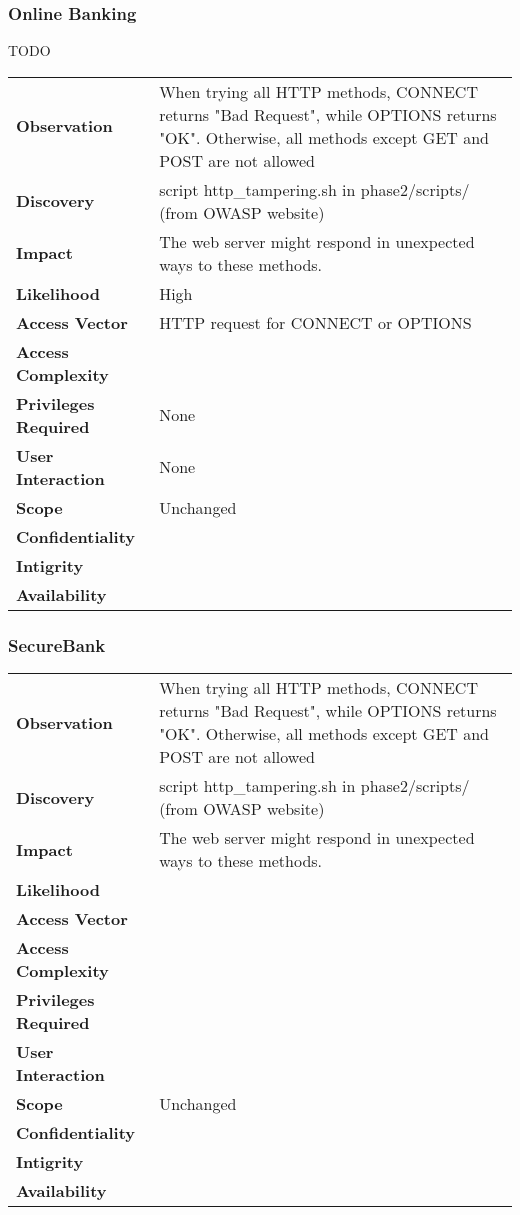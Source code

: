 \subsubsection*{Online Banking}
TODO

\begin{tabular}{l|p{10cm}}
\textbf{Observation} & When trying all HTTP methods, CONNECT returns "Bad Request", while OPTIONS returns "OK". Otherwise, all methods except GET and POST are not allowed\\
\textbf{Discovery} & script http\_tampering.sh in phase2/scripts/ (from OWASP website) \\
\textbf{Impact} & The web server might respond in unexpected ways to these methods. \\
\textbf{Likelihood} & High \\
\textbf{Access Vector} & HTTP request for CONNECT or OPTIONS\\
\textbf{Access Complexity} & \\
\textbf{Privileges Required} & None \\
\textbf{User Interaction} & None \\
\textbf{Scope} & Unchanged \\
\textbf{Confidentiality} & \\
\textbf{Intigrity} & \\
\textbf{Availability} & \\
\end{tabular}

\subsubsection*{SecureBank}

\begin{tabular}{l|p{10cm}}
\textbf{Observation} & When trying all HTTP methods, CONNECT returns "Bad Request", while OPTIONS returns "OK". Otherwise, all methods except GET and POST are not allowed\\
\textbf{Discovery} & script http\_tampering.sh in phase2/scripts/ (from OWASP website)\\
\textbf{Impact} & The web server might respond in unexpected ways to these methods.\\
\textbf{Likelihood} & \\
\textbf{Access Vector} & \\
\textbf{Access Complexity} & \\
\textbf{Privileges Required} & \\
\textbf{User Interaction} & \\
\textbf{Scope} & Unchanged \\
\textbf{Confidentiality} & \\
\textbf{Intigrity} & \\
\textbf{Availability} & \\
\end{tabular}

